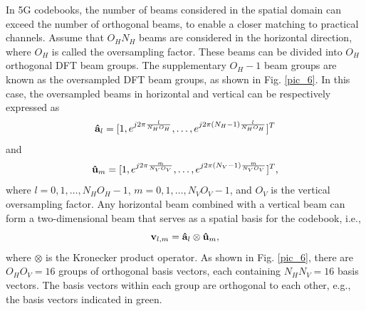 \documentclass[lettersize,journal]{IEEEtran}
\begin{document}
In 5G codebooks, the number of beams considered in the spatial domain can exceed the number of orthogonal beams, to enable a closer matching to practical channels. Assume that $O_HN_H$ beams are considered in the horizontal direction, where $O_H$ is called the oversampling factor. These beams can be divided into $O_H$ orthogonal DFT beam groups. The supplementary $O_H-1$ beam groups are known as the oversampled DFT beam groups, as shown in Fig. \ref{pic_6}. In this case, the oversampled beams in horizontal and vertical can be respectively expressed as
\begin{equation}
{ \bf{\hat a}}_l=[1, e^{j2\pi\frac{l}{N_HO_H}}, \ldots, e^{j2\pi(N_H-1)\frac{l}{N_HO_H}}]^T
\end{equation}
and 
\begin{equation}
{\bf{\hat u}}_m=[1, e^{j2\pi\frac{m}{N_VO_V}}, \ldots, e^{j2\pi(N_V-1)\frac{m}{N_VO_V}}]^T,
\end{equation}
where $l=0,1,\ldots,N_HO_H-1$, $m=0,1,\ldots,N_VO_V-1$, and $O_V$ is the  vertical oversampling factor. Any horizontal beam combined with a vertical beam can form a two-dimensional beam that serves as a spatial basis for the codebook, i.e.,
\begin{equation}\label{vv}
{{\bf{v}}_{l,m}} = {{\bf{\hat a}}_l} \otimes {{\bf{\hat u}}_m},
\end{equation}
where $\otimes$ is the Kronecker product operator. As shown in Fig.  \ref{pic_6}, there are $O_HO_V=16$ groups of orthogonal basis vectors, each containing $N_HN_V=16$ basis vectors. The basis vectors within each group are orthogonal to each other, e.g., the basis vectors indicated in green. 
\end{document}

